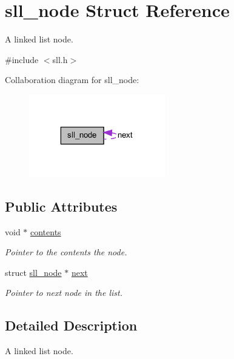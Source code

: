 \hypertarget{structsll__node}{
\section{sll\_\-node Struct Reference}
\label{structsll__node}
}


A linked list node.  




{\ttfamily \#include $<$sll.h$>$}



Collaboration diagram for sll\_\-node:\nopagebreak
\begin{figure}[H]
\begin{center}
\leavevmode
\includegraphics[width=169pt]{structsll__node__coll__graph}
\end{center}
\end{figure}
\subsection*{Public Attributes}
\begin{DoxyCompactItemize}
\item 
void $\ast$ \hyperlink{structsll__node_aafacbed96ba149b0b8c705426196154c}{contents}
\begin{DoxyCompactList}\small\item\em Pointer to the contents the node. \item\end{DoxyCompactList}\item 
struct \hyperlink{structsll__node}{sll\_\-node} $\ast$ \hyperlink{structsll__node_aa2e4c5d743ad44e759b5ca13f9915826}{next}
\begin{DoxyCompactList}\small\item\em Pointer to next node in the list. \item\end{DoxyCompactList}\end{DoxyCompactItemize}


\subsection{Detailed Description}
A linked list node. 

